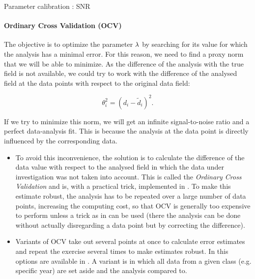 \begin{frame}[allowframebreaks]{Parameter calibration : SNR}
\framesubtitle{Ordinary Cross Validation (OCV)}

The objective is to optimize the parameter $\lambda$ by searching for its value for which the analysis has a minimal error. For this reason, we need to find a proxy norm that we will be able to minimize. As the difference of the analysis with the true field is not available, we could try to work with the difference of the analysed field at the data points with respect to the original data field:

\begin{equation}
{\theta_i^2} = {(d_i - \tilde{d}_i)^2}.
\end{equation}

If we try to minimize this norm, we will get an infinite signal-to-noise ratio and a perfect data-analysis fit. This is because the analysis at the data point is directly influenced by the corresponding data. 

\begin{itemize}
\item To avoid this inconvenience, the solution is to calculate the difference of the data value with respect to the analysed field in which the data under investigation was not taken into account. This is called the \textit{Ordinary Cross Validation} and is, with a practical trick, implemented in . To make this estimate robust, the analysis has to be repeated over a large number of data points, increasing the computing cost, so that OCV is generally too expensive to perform unless a trick as in  can be used (there the analysis can be done without actually disregarding a data point but by correcting the difference).
 
\item Variants of OCV take out several points at once to calculate error estimates and repeat the exercise several times to make estimates robust.  In \diva this options are available in . A variant is  in which all data from a given class (e.g. specific year) are set aside and the analysis compared to.
\end{itemize}

\end{frame}


